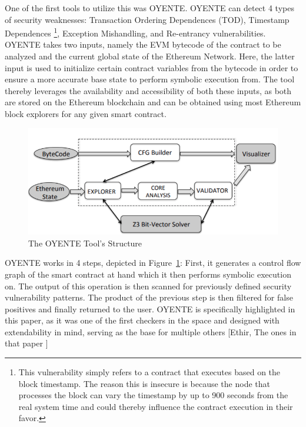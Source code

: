 \documentclass[letterpaper,twocolumn,10pt]{article}
\begin{document}
One of the first tools to utilize this was OYENTE. OYENTE can detect 4 types of security weaknesses: Transaction Ordering Dependences (TOD), Timestamp Dependences \footnote{This vulnerability simply refers to a contract that executes based on the block timestamp. The reason this is insecure is because the node that processes the block can vary the timestamp by up to 900 seconds from the real system time and could thereby influence the contract execution in their favor.}, Exception Mishandling, and Re-entrancy vulnerabilities. OYENTE takes two inputs, namely the EVM bytecode of the contract to be analyzed and the current global state of the Ethereum Network. Here, the latter input is used to initialize certain contract variables from the bytecode in order to ensure a more accurate base state to perform symbolic execution from. The tool thereby leverages the availability and accessibility of both these inputs, as both are stored on the Ethereum blockchain and can be obtained using most Ethereum block explorers for any given smart contract. 

\begin{figure}
\begin{center}
\includegraphics[scale=0.35]{oyente}
\end{center}
\caption{\label{fig:oyente} The OYENTE Tool's Structure}
\end{figure}


OYENTE works in 4 steps, depicted in Figure~\ref{fig:oyente}: First, it generates a control flow graph of the smart contract at hand which it then performs symbolic execution on. The output of this operation is then scanned for previously defined security vulnerability patterns. The product of the previous step is then filtered for false positives and finally returned to the user. OYENTE is specifically highlighted in this paper, as it was one of the first checkers in the space and designed with extendability in mind, serving as the base for multiple others [Ethir, The ones in that paper ]
\end{document}
